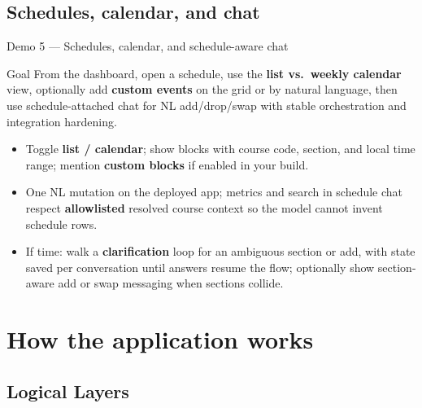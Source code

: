 \documentclass[10pt,compress,english]{beamer}
\begin{document}
\subsection{Schedules, calendar, and chat}

\begin{frame}{Demo 5 --- Schedules, calendar, and schedule-aware chat}
  \begin{block}{Goal}
    From the dashboard, open a schedule, use the \textbf{list vs.\ weekly calendar} view, optionally add \textbf{custom events} on the grid or by natural language, then use schedule-attached chat for NL add/drop/swap with stable orchestration and integration hardening.
  \end{block}
  \begin{itemize}\setlength\itemsep{0.22em}
    \item Toggle \textbf{list / calendar}; show blocks with course code, section, and local time range; mention \textbf{custom blocks} if enabled in your build.
    \item One NL mutation on the deployed app; metrics and search in schedule chat respect \textbf{allowlisted} resolved course context so the model cannot invent schedule rows.
    \item If time: walk a \textbf{clarification} loop for an ambiguous section or add, with state saved per conversation until answers resume the flow; optionally show section-aware add or swap messaging when sections collide.
  \end{itemize}
\end{frame}

\section{How the application works}

\subsection{Logical Layers}
\end{document}

